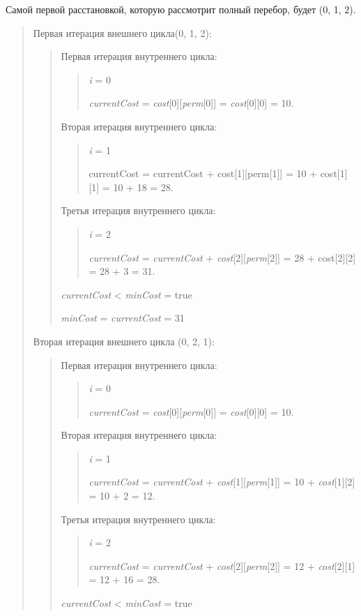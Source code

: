 \documentclass[]{article}
\begin{document}
Самой первой расстановкой, которую рассмотрит полный перебор, будет (0,
1, 2).
\begin{quote}
Первая итерация внешнего цикла(0, 1, 2):
\begin{quote}
Первая итерация внутреннего цикла:


\begin{quote}
\emph{i} = 0

\emph{currentCost} = \emph{cost}{[}0{]}{[}\emph{perm}{[}0{]}{]} =
\emph{cost}{[}0{]}{[}0{]} = 10.
\end{quote}
Вторая итерация внутреннего цикла:
\begin{quote}
\emph{i} = 1

{currentCost} = {currentCost} +
{cost}{[}1{]}{[}{perm}{[}1{]}{]} = 10 +
{cost}{[}1{]}{[}1{]} = 10 + 18 = 28.
\end{quote}
Третья итерация внутреннего цикла:
\begin{quote}
\emph{i} = 2

\emph{\textit{currentCost}} = \emph{currentCost} +
\emph{cost}{[}2{]}{[}\emph{perm}{[}2{]}{]} = 28 + cost{[}2{]}{[}2{]} =
28 + 3 = 31.
\end{quote}

\emph{currentCost} \textless{} \emph{minCost} = true

\emph{minCost} = \emph{currentCost} = 31
\end{quote}
Вторая итерация внешнего цикла (0, 2, 1):
\begin{quote}
Первая итерация внутреннего цикла:

\begin{quote}
\emph{i} = 0

\emph{currentCost} = \emph{cost}{[}0{]}{[}\emph{perm}{[}0{]}{]} =
\emph{cost}{[}0{]}{[}0{]} = 10.
\end{quote}

Вторая итерация внутреннего цикла:
\begin{quote}
\emph{i} = 1

\emph{currentCost} = \emph{currentCost} +
\emph{cost}{[}1{]}{[}\emph{perm}{[}1{]}{]} = 10 +
\emph{cost}{[}1{]}{[}2{]} = 10 + 2 = 12.
\end{quote}
Третья итерация внутреннего цикла:
\begin{quote}
\emph{i} = 2

\emph{currentCost} = \emph{currentCost} +
\emph{cost}{[}2{]}{[}\emph{perm}{[}2{]}{]} = 12 +
\emph{cost}{[}2{]}{[}1{]} = 12 + 16 = 28.
\end{quote}

\emph{currentCost} \textless{} \emph{minCost} = true


\end{quote}
\end{quote}
\end{document}
